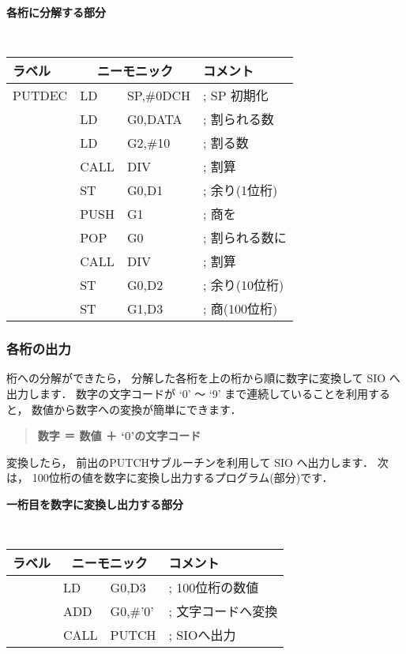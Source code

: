 \begin{center}
{\bf 各桁に分解する部分}
{\small\tt
\begin{tabular}{|l|l l l|} \hline
ラベル & \multicolumn{2}{|c}{ニーモニック} & コメント    \\
\hline
PUTDEC & LD   & SP,\#0DCH        & ; SP 初期化  \\
       & LD   & G0,DATA          & ; 割られる数     \\
       & LD   & G2,\#10          & ; 割る数         \\
       & CALL & DIV              & ; 割算           \\
       & ST   & G0,D1            & ; 余り(1位桁)  \\
       & PUSH & G1               & ; 商を           \\
       & POP  & G0               & ; 割られる数に   \\
       & CALL & DIV              & ; 割算           \\
       & ST   & G0,D2            & ; 余り(10位桁) \\
       & ST   & G1,D3            & ; 商(100位桁)  \\
\hline
\end{tabular}
}
\end{center}

\newpage

\subsubsection{各桁の出力}
桁への分解ができたら，
分解した各桁を上の桁から順に数字に変換して SIO へ出力します．
数字の文字コードが `0' 〜 `9' まで連続していることを利用すると，
数値から数字への変換が簡単にできます．

\begin{quote}
{\bf 数字 ＝ 数値 ＋ `0'の文字コード}
\end{quote}

変換したら，
前出のPUTCHサブルーチンを利用して SIO へ出力します．
次は，
100位桁の値を数字に変換し出力するプログラム(部分)です．

\begin{center}
{\bf 一桁目を数字に変換し出力する部分}
{\small\tt
\begin{tabular}{|l|l l l|} \hline
ラベル & \multicolumn{2}{|c}{ニーモニック} & コメント    \\
\hline
       & LD   & G0,D3            & ; 100位桁の数値      \\
       & ADD  & G0,\#'0'         & ; 文字コードへ変換  \\
       & CALL & PUTCH            & ; SIOへ出力         \\
\hline
\end{tabular}
}
\end{center}


